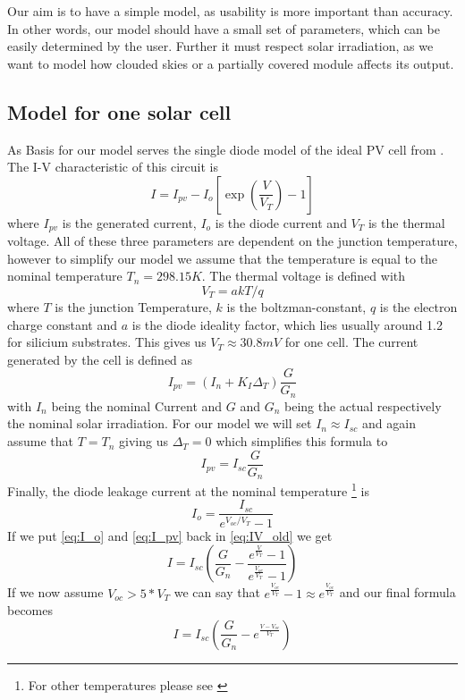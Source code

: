 Our aim is to have a simple model, as usability is more important than accuracy.
In  other words, our model should have a small set of parameters, which  can  be
easily determined by the  user. Further it must respect solar irradiation, as we
want  to  model  how clouded skies or a partially  covered  module  affects  its
output.


\subsection{Model for one solar cell}

As Basis for our model serves the single diode model of  the  ideal PV cell from
\cite{ref:villa:pvmodel}  . The I-V characteristic of
this circuit is
\begin{equation} \label{eq:IV_old}
 I = I_{pv} - I_o \left[ \exp \left( \frac{V}{V_T} \right) - 1 \right]
\end{equation}
where $I_{pv}$ is the generated current, $I_o$ is the diode current and $V_T$ is
the thermal voltage. All of these three parameters are dependent on the junction
temperature, however to simplify our model  we  assume  that  the temperature is
equal to the nominal temperature $T_n = 298.15K$. The thermal voltage is defined
with
\begin{equation}
    V_T = a k T / q
\end{equation}
where $T$ is the junction Temperature,  $k$ is the boltzman-constant, $q$ is the
electron charge constant and $a$  is  the  diode  ideality  factor,  which  lies
usually around 1.2 for silicium substrates. This  gives  us $V_T \approx 30.8mV$
for one cell. The current generated by the cell is defined as
\begin{equation}
    I_{pv} = \left( I_n + K_I \Delta_T \right) \frac{G}{G_n}
\end{equation}
with  $I_n$  being  the  nominal  Current  and  $G$  and $G_n$ being the  actual
respectively  the nominal solar irradiation. For our  model  we  will  set  $I_n
\approx I_{sc}$ and again assume that $T  =  T_n$ giving us $\Delta_T = 0$ which
simplifies this formula to
\begin{equation} \label{eq:I_pv}
    I_{pv} = I_{sc} \frac{G}{G_n}
\end{equation}
Finally, the  diode  leakage  current  at  the nominal temperature \footnote{For
other temperatures please see \cite{ref:villa:pvmodel}} is
\begin{equation} \label{eq:I_o}
    I_o = \frac{I_{sc}}{e^{V_{oc} / V_T} - 1}
\end{equation}
If we put \eqref{eq:I_o} and \eqref{eq:I_pv}  back  in  \eqref{eq:IV_old} we get
\begin{equation}
    I = I_{sc} \left( \frac{G}{G_n} - \frac{e^{\frac{V}{V_T}}-1}{e^{\frac{V_{oc}}{V_T}}-1} \right)
\end{equation}
If we now assume $V_{oc} >  5  *  V_T$ we can say that $e^{\frac{V_{oc}}{V_T}}-1
\approx e^{\frac{V_{oc}}{V_T}}$ and our final formula becomes
\begin{equation} \label{eq:IV}
    I = I_{sc} \left( \frac{G}{G_n} - e^{\frac{V - V_{oc}}{V_T}} \right)
\end{equation}


